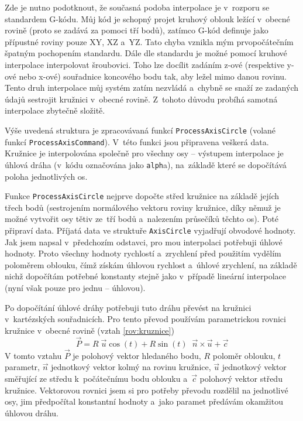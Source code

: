 		Zde je nutno podotknout, že současná podoba interpolace je v~rozporu se standardem G-kódu. Můj kód je schopný projet kruhový oblouk ležící v~obecné rovině (proto se zadává za pomoci tří bodů), zatímco G-kód definuje jako přípustné roviny pouze XY, XZ a~YZ. Tato chyba vznikla mým prvopočátečním špatným pochopením standardu. Dále dle standardu je možné pomocí kruhové interpolace interpolovat šroubovici. Toho lze docílit zadáním z-ové (respektive y-ové nebo x-ové) souřadnice koncového bodu tak, aby ležel mimo danou rovinu. Tento druh interpolace můj systém zatím nezvládá a~chybně se snaží ze zadaných údajů sestrojit kružnici v~obecné rovině. Z~tohoto důvodu probíhá samotná interpolace zbytečně složitě.
		
		Výše uvedená struktura je zpracovávaná funkcí {\tt ProcessAxisCircle} (volané funkcí {\tt ProcessAxisCommand}). V~této funkci jsou připravena veškerá data. Kružnice je interpolována společně pro všechny osy -- výstupem interpolace je úhlová dráha (v~kódu označována jako {\tt alph}a), na~základě které se dopočítává poloha jednotlivých os.
		
		Funkce {\tt ProcessAxisCircle} nejprve dopočte střed kružnice na základě jejích třech bodů (sestrojením normálového vektoru roviny kružnice, díky němuž je možné vytvořit osy tětiv ze~tří bodů a~nalezením průsečíků těchto os). Poté připraví data. Příjatá data ve struktuře {\tt AxisCircle} vyjadřují obvodové hodnoty. Jak jsem napsal v~předchozím odstavci, pro mou interpolaci potřebuji úhlové hodnoty. Proto všechny hodnoty rychlostí a~zrychlení před použitím vydělím poloměrem oblouku, čímž získám úhlovou rychlost a~úhlové zrychlení, na základě nichž dopočítám potřebné konstanty stejně jako v~případě lineární interpolace (nyní však pouze pro jednu  -- úhlovou).
		
		Po dopočítání úhlové dráhy potřebuji tuto dráhu převést na kružnici v~kartézských souřadnicích. Pro tento převod používám parametrickou rovnici kružnice v~obecné rovině (vztah \ref{rov:kruznice}\cite{kruznice})
		\begin{equation}
		\label{rov:kruznice}
		\vec{P} = R\;\vec{u}\cos(t) + R\sin(t) \;\;\vec{n}\times\vec{u} + \vec{c}
		\end{equation}
		V tomto vztahu $\vec{P}$ je polohový vektor hledaného bodu, $R$ poloměr oblouku, $t$ parametr, $\vec{n}$ jednotkový vektor kolmý na rovinu kružnice, $\vec{u}$ jednotkový vektor směřující ze středu k~počátečnímu bodu oblouku a~$\vec{c}$ polohový vektor středu kružnice. Vektorovou rovnici jsem si pro potřeby převodu rozdělil na jednotlivé osy, jim předpočítal konstantní hodnoty a~jako paramet předávám okamžitou úhlovou dráhu.
		

